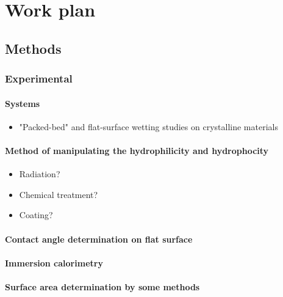 \documentclass[a4paper,12pt,single,pdftex]{scrartcl}
\begin{document}
{\label{ID_1615838882}\section{Work plan}

\label{ID_1509493354}\subsection{Methods}

\label{ID_176697614}\subsubsection{Experimental}

\label{ID_222214319}\paragraph{Systems}

\begin{itemize}
\label{ID_890750199}\item "Packed-bed" and flat-surface wetting studies on crystalline materials
\end{itemize}
\label{ID_890750199}\label{ID_1528992532}\paragraph{Method of manipulating the hydrophilicity and hydrophocity}

\begin{itemize}
\label{ID_630039349}\item Radiation?
\label{ID_1162892636}\item Chemical treatment?
\label{ID_1113661769}\item Coating?
\end{itemize}
\label{ID_630039349}\label{ID_1162892636}\label{ID_1113661769}\label{ID_768785223}\paragraph{Contact angle determination on flat surface}

\label{ID_1121131843}\paragraph{Immersion calorimetry}

\label{ID_627706002}\paragraph{Surface area determination by some methods}

}
\end{document}

